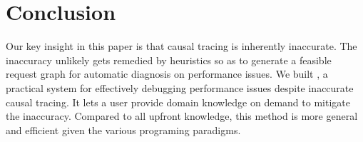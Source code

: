 \section{Conclusion} \label{sec:conclusion}

Our key insight in this paper is that causal tracing is inherently inaccurate.
The inaccuracy unlikely gets remedied by heuristics so as to generate a feasible
request graph for automatic diagnosis on performance issues. We built \xxx, a
practical system for effectively debugging performance issues despite inaccurate
causal tracing. It lets a user provide domain knowledge on demand to mitigate
the inaccuracy. Compared to all upfront knowledge, this method is more general
and efficient given the various programing paradigms.

\clearpage
